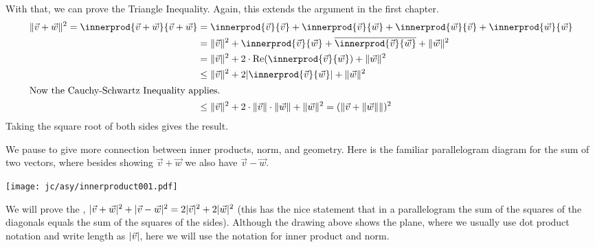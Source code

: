 With that, we can prove the Triangle Inequality.
Again, this extends the argument in the first chapter.
\begin{align*}
  \norm{\vec{v}+\vec{w}}^2
  =\innerprod{\vec{v}+\vec{w}}{\vec{v}+\vec{w}}  
  &=\innerprod{\vec{v}}{\vec{v}}
    +\innerprod{\vec{v}}{\vec{w}}  
    +\innerprod{\vec{w}}{\vec{v}}  
    +\innerprod{\vec{w}}{\vec{w}}   \\ 
  &=\norm{\vec{v}}^2
    +\innerprod{\vec{v}}{\vec{w}}  
    +\compconj{\innerprod{\vec{v}}{\vec{w}}}  
    +\norm{\vec{w}}^2              \\   
  &=\norm{\vec{v}}^2
    +2\cdot\RE{\innerprod{\vec{v}}{\vec{w}}}  
    +\norm{\vec{w}}^2      \\
  &\leq\norm{\vec{v}}^2
    +2\absval{\innerprod{\vec{v}}{\vec{w}}}  
    +\norm{\vec{w}}^2     \\
\intertext{Now the Cauchy-Schwartz Inequality applies.}
  &\leq\norm{\vec{v}}^2
    +2\cdot\norm{\vec{v}}\cdot\norm{\vec{w}}
    +\norm{\vec{w}}^2      
  =(\norm{\vec{v}+\norm{\vec{w}}})^2         
\end{align*}
Taking the square root of both sides gives the result.



We pause to give more connection between inner products, norm, and geometry.
Here is the familiar parallelogram diagram for the sum of two vectors,
where besides showing $\vec{v}+\vec{w}$ we also have $\vec{v}-\vec{w}$. 
\begin{center}
  \texttt{[image: jc/asy/innerproduct001.pdf]}
\end{center}
We will prove the 
,
$\lvert\vec{v}+\vec{w}\rvert^2+\lvert\vec{v}-\vec{w}\rvert^2=2\lvert\vec{v}\rvert^2+2\lvert\vec{w}\rvert^2$
(this has the nice statement that in a parallelogram the sum of the squares 
of the diagonals equals the sum of the squares of the sides).
Although the drawing above shows the plane, where we usually use dot product 
notation and write length as $\lvert\vec{v}\rvert$, 
here we will use the notation for inner product and norm.

